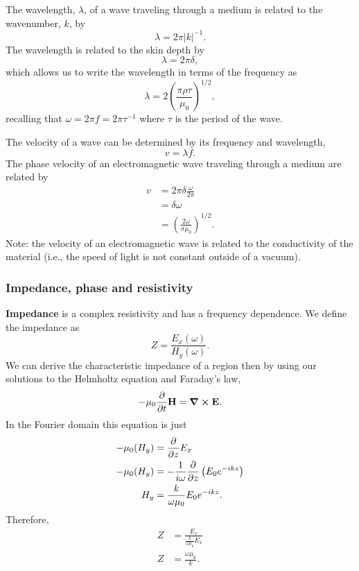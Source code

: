 \begin{framed}
The wavelength, $\lambda$, of a wave traveling through a medium is related to
the wavenumber, $k$, by
\begin{equation*}
    \lambda = 2 \pi |k|^{-1}.
\end{equation*}
The wavelength is related to the skin depth by 
\begin{equation*}
    \lambda = 2 \pi \delta ,
\end{equation*}
which allows us to write the wavelength in terms of the frequency as
\begin{equation*}
    \lambda = 2 \left( \frac{\pi \rho \tau}{\mu_0} \right)^{1/2},
\end{equation*}
recalling that $\omega = 2\pi f = 2\pi \tau^{-1}$ where $\tau$ is the period of
the wave.

The velocity of a wave can be determined by its frequency and wavelength,
\begin{equation*}
    v = \lambda f .
\end{equation*}
The phase velocity of an electromagnetic wave traveling through a medium are
related by
\begin{align*}
      v &= 2 \pi \delta \frac{\omega}{2 \pi}\\
      &= \delta \omega \\
      &= \left( \frac{2 \omega}{\sigma \mu_0} \right)^{1/2}.
\end{align*}
Note: the velocity of an electromagnetic wave is related to the conductivity of
the material (i.e., the speed of light is not constant outside of a vacuum).
\end{framed}


\subsubsection{Impedance, phase and resistivity}
{\bf Impedance} is a complex resistivity and has a frequency dependence.  We define
the impedance as
\begin{equation}
    Z = \frac{E_x(\omega)}{H_y(\omega)}.
\end{equation}
We can derive the characteristic impedance of a region then by using our
solutions to the Helmholtz equation and Faraday's law,
\begin{equation*}
    -\mu_0 \pdv{}{t} \vb{H} = \curl \vb{E}.
\end{equation*}
In the Fourier domain this equation is just
\begin{align*}
    -\mu_0 (H_y) & = \pdv{}{z} E_x \\
    -\mu_0 (H_y) & = -\frac{1}{i \omega} \pdv{}{z} \left( E_0 e^{-ikz} \right) \\
    H_y & = \frac{k}{\omega \mu_0} E_0 e^{-ikz}.
\end{align*}
Therefore,
\begin{align}
    Z & = \frac{E_{x}}{\frac{k}{\omega \mu_0}E_x} \\
    Z & = \frac{\omega \mu_0}{k}.
\end{align}

